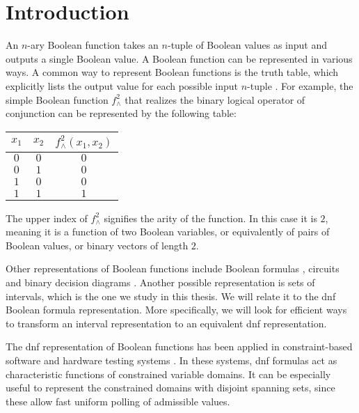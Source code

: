 \chapter*{Introduction}

An $n$-ary Boolean function takes an $n$-tuple of Boolean values as input
and outputs a single Boolean value.
A Boolean function can be represented in various ways.
A common way to represent Boolean functions
is the truth table,
which explicitly lists the output value for each possible input $n$-tuple \citep[Definition 1.2]{Crama2011}.
For example,
the simple Boolean function $f^2_{\wedge}$ that realizes the binary logical operator of conjunction
can be represented by the following table:
\begin{center}
\begin{tabular}{cc|c}
$x_1$ & $x_2$ & $f^2_{\wedge}(x_1, x_2)$ \\
\hline
$0$ & $0$ & $0$ \\
$0$ & $1$ & $0$ \\
$1$ & $0$ & $0$ \\
$1$ & $1$ & $1$ \\
\end{tabular}
\end{center}

The upper index of $f^2_{\wedge}$
signifies the arity of the function.
In this case it is $2$,
meaning it is a function of two Boolean variables,
or equivalently of pairs of Boolean values,
or binary vectors of length $2$.

Other representations of Boolean functions
include
Boolean formulas \citep[Definition 1.4]{Crama2011},
circuits
\citep[Definition 3.1]{Wegener1987}
and binary decision diagrams \citep[Section 1.12.3]{Crama2011}.
Another possible representation is sets of intervals,
which is the one we study in this thesis.
We will relate it to the \acrfull{dnf}
Boolean formula representation.
More specifically,
we will look for efficient ways to transform an interval representation
to an equivalent \acrshort{dnf} representation.

The \acrshort{dnf} representation of Boolean functions
has been applied in constraint-based software
and hardware
testing systems
\citep{DeMillo1991,Lewin1995}.
In these systems,
\acrshort{dnf} formulas act as characteristic functions
of constrained variable domains.
It can be especially useful to represent the constrained
domains with disjoint spanning sets,
since these allow fast uniform polling
of admissible values.

